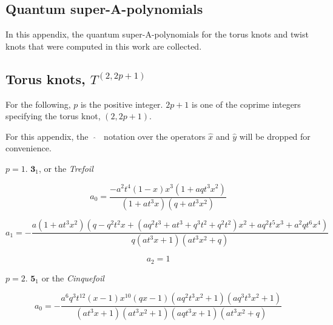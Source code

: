 \documentclass[a4paper,titlepage,twoside]{book}
\begin{document}
\begin{appendix}

\chapter{Quantum super-A-polynomials}\label{app:qsAp}

In this appendix, the quantum super-A-polynomials for the torus knots and twist knots that were computed in this work are collected.  

\section{Torus knots, $T^{(2,2p+1)}$ }

For the following, $p$ is the positive integer.  $2p+1$ is one of the coprime integers specifying the torus knot, $(2,2p+1)$. 


For this appendix, the \, $\widehat{\,}$ \, notation over the operators $\widehat{x}$ and $\widehat{y}$ will be dropped for convenience. 

$p=1$. $\mathbf{3}_1$, or the \emph{Trefoil}


\begin{equation}
a_0 =   \frac{ - a^2 t^4 (1-x) x^3 \left(1 + a q t^3 x^2 \right)}{\left(1 + a t^3 x \right) \left(q + a t^3 x^2 \right)}
\end{equation}

\begin{equation}
  a_1 = -\frac{a \left( 1 + a t^3 x^2 \right) \left( q - q^2  t^2 x  + ( a q^2 t^3 +a t^3 +q^3 t^2 +q^2 t^2  ) x^2  +a q^2 t^5 x^3 + a^2 q t^6 x^4   \right) }{q \left(a t^3 x+1\right) \left(a t^3   x^2+q\right)}
\end{equation}

\begin{equation}
a_2 = 1
\end{equation}



$p=2$. $\mathbf{5}_1$ or the \emph{Cinquefoil}


\begin{equation}
  a_0 = -\frac{a^6 q^3 t^{12} (x-1) x^{10} (q x-1) \left(a q^2 t^3 x^2+1\right) \left(a   q^3 t^3 x^2+1\right)}{\left(a t^3 x+1\right) \left(a t^3 x^2+1\right) \left(a   q t^3 x+1\right) \left(a t^3 x^2+q\right)}
\end{equation}


\end{appendix}
\end{document}
